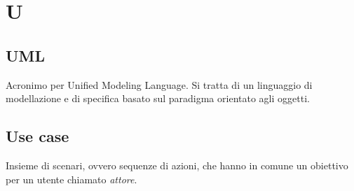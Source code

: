 \chapter{U}
\section{UML}
Acronimo per Unified Modeling Language. Si tratta di un linguaggio di modellazione e di specifica basato sul paradigma orientato agli oggetti.

\section{Use case}
Insieme di scenari, ovvero sequenze di azioni, che hanno in comune un obiettivo per un utente chiamato \emph{attore}.
